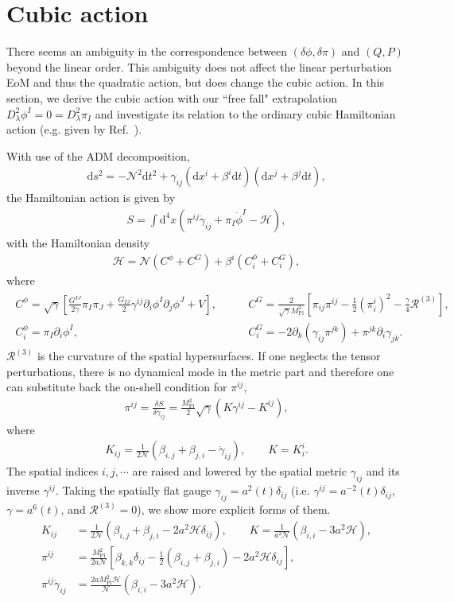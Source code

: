 \documentclass[aps, prd
, preprint
, nofootinbib 
, notitlepage
, longbibliography
]{revtex4-1}
\newcommand{\var}[2]{\frac{\delta #1}{\delta #2}}
\newcommand{\dd}{\mathrm{d}}
\newcommand{\Mpl}{M_\text{Pl}}
\newcommand{\dps}{\displaystyle}
\newcommand{\calH}{\mathcal{H}}
\newcommand{\scrH}{\mathscr{H}}
\newcommand{\calN}{\mathcal{N}}
\newcommand{\calR}{\mathcal{R}}
\newcommand{\dphi}{\delta\phi}
\newcommand{\dpi}{\delta\pi}
\newcommand{\bae}[1]{\begin{align} #1 \end{align}}
\begin{document}
\section{Cubic action}

There seems an ambiguity in the correspondence between $(\dphi,\dpi)$ and $(Q,P)$ beyond the linear order.
This ambiguity does not affect the linear perturbation EoM and thus the quadratic action, but does change the cubic action.
In this section, we derive the cubic action with our ``free fall" extrapolation $D_\lambda^2\phi^I=0=D_\lambda^2\pi_I$ and investigate its relation to the ordinary cubic Hamiltonian action (e.g. given by Ref.~\cite{Butchers:2018hds}).

With use of the ADM decomposition,
\bae{
    \dd s^2=-\calN^2\dd t^2+\gamma_{ij}(\dd x^i+\beta^i\dd t)(\dd x^j+\beta^j\dd t),
}
the Hamiltonian action is given by
\bae{
    S=\int\dd^4x(\pi^{ij}\dot{\gamma}_{ij}+\pi_I\dot{\phi}^I-\scrH),
}
with the Hamiltonian density
\bae{
    \scrH=\calN(C^\phi+C^G)+\beta^i(C_i^\phi+C_i^G),
}
where
\bae{
    \begin{array}{ll}
        \dps
        C^\phi=\sqrt{\gamma}\left[\frac{G^{IJ}}{2\gamma}\pi_I\pi_J+\frac{G_{IJ}}{2}\gamma^{ij}\partial_i\phi^I\partial_j\phi^J+V\right], & 
        \dps\qquad
        C^G=\frac{2}{\sqrt{\gamma}\Mpl^2}\left[\pi_{ij}\pi^{ij}-\frac{1}{2}\left(\pi^i_i\right)^2-\frac{\gamma}{4}\calR^{(3)}\right], \\
        C^\phi_i=\pi_I\partial_i\phi^I, &
        \dps\qquad
        C^G_i=-2\partial_k(\gamma_{ij}\pi^{jk})+\pi^{jk}\partial_i\gamma_{jk}.
    \end{array}
}
$\calR^{(3)}$ is the curvature of the spatial hypersurfaces.
If one neglects the tensor perturbations, there is no dynamical mode in the metric part and therefore one can substitute back the on-shell condition for $\pi^{ij}$,
\bae{
    \pi^{ij}=\var{S}{\dot{\gamma}_{ij}}=\frac{\Mpl^2}{2}\sqrt{\gamma}(K\gamma^{ij}-K^{ij}),
}
where
\bae{
    K_{ij}=\frac{1}{2\calN}(\beta_{i,j}+\beta_{j,i}-\dot{\gamma}_{ij}), \qquad K=K^i_i.
}
The spatial indices $i,j,\cdots$ are raised and lowered by the spatial metric $\gamma_{ij}$ and its inverse $\gamma^{ij}$.
Taking the spatially flat gauge $\gamma_{ij}=a^2(t)\delta_{ij}$ (i.e. $\gamma^{ij}=a^{-2}(t)\delta_{ij}$, $\gamma=a^6(t)$, and $\calR^{(3)}=0$), we show more explicit forms of them.
\bae{
    K_{ij}&=\frac{1}{2\calN}(\beta_{i,j}+\beta_{j,i}-2a^2\calH\delta_{ij}), \qquad K=\frac{1}{a^2\calN}(\beta_{i,i}-3a^2\calH), \\
    \pi^{ij}&=\frac{\Mpl^2}{2a\calN}\left[\beta_{k,k}\delta_{ij}-\frac{1}{2}(\beta_{i,j}+\beta_{j,i})-2a^2\calH\delta_{ij}\right], \\
    \pi^{ij}\dot{\gamma}_{ij}&=\frac{2a\Mpl^2\calH}{\calN}(\beta_{i,i}-3a^2\calH).
}
\end{document}
